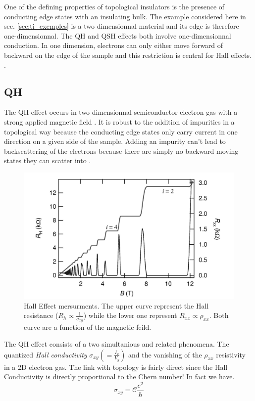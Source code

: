 One of the defining properties of topological insulators is the presence of conducting edge states with an insulating bulk. The example considered here in sec. \ref{sec:ti_exemples} is a two dimensionnal material and its edge is therefore one-dimensionnal. The QH and QSH effects both involve one-dimensionnal conduction. In one dimension, electrons can only either move forward of backward on the edge of the sample and this restriction is central for Hall effects. \cite{qi_quantum_2010}.  
\subsection{QH}
The QH effect occurs in two dimensionnal semiconductor electron gas with a strong applied magnetic field \cite{qi_quantum_2010}. It is robust to the addition of impurities in a topological way because the conducting edge states only carry current in one direction on a given side of the sample. Adding an impurity can't lead to backscattering of the electrons because there are simply no backward moving states they can scatter into \cite{qi_quantum_2010}. 

\begin{figure}[h]
    \includegraphics[width=\columnwidth]{sections/visuel/Hall_effect.png}
    \caption{Hall Effect mersurments. The upper curve represent the Hall resistance ($R_h \propto \frac{1}{\sigma_{xy}}$) while the lower one represent $R_{xx} \propto \rho_{xx}$. Both curve are a function of the magnetic feild.}
    \label{fig:Hall_effet}
\end{figure}

The QH effect consists of a two simultanious and related phenomena. The quantized \textit{Hall conductivity} $\sigma_{xy}(=\frac{I_x}{V_y})$ and the vanishing of the $\rho_{xx}$ resistivity in a 2D electron gas. The link with topology is fairly direct since the Hall Conductivity is directly proportional to the Chern number! In fact we have.
\begin{equation}
\sigma_{xy} = \mathcal{C}\frac{e^2}{\hbar}
\end{equation}

